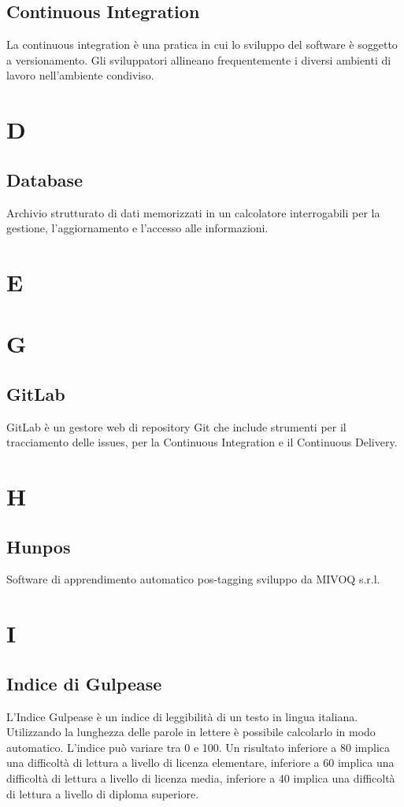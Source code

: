 	
	\subsection{Continuous Integration}
	La continuous integration è una pratica in cui lo sviluppo del software è soggetto a versionamento. Gli sviluppatori allineano frequentemente i diversi ambienti di lavoro nell'ambiente condiviso.
	
	\section{D}
	\subsection{Database}
	Archivio strutturato di dati memorizzati in un calcolatore interrogabili per la gestione, l'aggiornamento e l'accesso alle informazioni.
	\section{E}
	
	\section{G}
	\subsection{GitLab} 
	GitLab è un gestore web di repository Git che include strumenti per il tracciamento delle issues, per la Continuous Integration e il Continuous Delivery.
	
	\section{H}
	\subsection{Hunpos}
	Software di apprendimento automatico pos-tagging sviluppo da MIVOQ s.r.l.
	
	\section{I}
	\subsection{Indice di Gulpease}
	L'Indice Gulpease è un indice di leggibilità di un testo in lingua italiana. Utilizzando la lunghezza delle parole in lettere è possibile calcolarlo in modo automatico. L'indice può variare tra 0 e 100. Un risultato inferiore a 80 implica una difficoltà di lettura a livello di licenza elementare, inferiore a 60 implica una difficoltà di lettura a livello di licenza media, inferiore a 40 implica una difficoltà di lettura a livello di diploma superiore.
